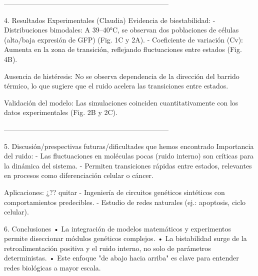 -----------------------------------------------------------------------

4. Resultados Experimentales (Claudia)
Evidencia de biestabilidad:
- Distribuciones bimodales: A 39–40°C, se observan dos poblaciones de células (alta/baja expresión de GFP) (Fig. 1C y 2A).
- Coeficiente de variación (Cv): Aumenta en la zona de transición, reflejando fluctuaciones entre estados (Fig. 4B).

Ausencia de histéresis:
No se observa dependencia de la dirección del barrido térmico, lo que sugiere que el ruido acelera las transiciones entre estados.

Validación del modelo:
Las simulaciones coinciden cuantitativamente con los datos experimentales (Fig. 2B y 2C).

-----------------------------------------------------------------------

5. Discusión/prespectivas futuras/dificultades que hemos encontrado
Importancia del ruido:
- Las fluctuaciones en moléculas pocas (ruido interno) son críticas para la dinámica del sistema.
- Permiten transiciones rápidas entre estados, relevantes en procesos como diferenciación celular o cáncer.

Aplicaciones: ¿?? quitar
- Ingeniería de circuitos genéticos sintéticos con comportamientos predecibles.
- Estudio de redes naturales (ej.: apoptosis, ciclo celular).

6. Conclusiones
•	La integración de modelos matemáticos y experimentos permite diseccionar módulos genéticos complejos.
•	La bistabilidad surge de la retroalimentación positiva y el ruido interno, no solo de parámetros deterministas.
•	Este enfoque "de abajo hacia arriba" es clave para entender redes biológicas a mayor escala.




